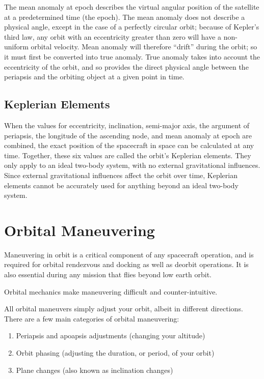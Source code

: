 The mean anomaly at epoch describes the virtual angular position of
the satellite at a predetermined time (the epoch). The mean anomaly
does not describe a physical angle, except in the case of a perfectly
circular orbit; because of Kepler's third law, any orbit with an
eccentricity greater than zero will have a non-uniform orbital
velocity. Mean anomaly will therefore ``drift'' during the orbit; so
it must first be converted into true anomaly. True anomaly takes into
account the eccentricity of the orbit, and so provides the direct
physical angle between the periapsis and the orbiting object at a
given point in time.

\subsection{Keplerian Elements}

When the values for eccentricity, inclination, semi-major axis, the
argument of periapsis, the longitude of the ascending node, and mean
anomaly at epoch are combined, the exact position of the spacecraft in
space can be calculated at any time. Together, these six values are
called the orbit's Keplerian elements. They only apply to an ideal
two-body system, with no external gravitational influences. Since
external gravitational influences affect the orbit over time,
Keplerian elements cannot be accurately used for anything beyond an
ideal two-body system.

\section{Orbital Maneuvering}

Maneuvering in orbit is a critical component of any spacecraft
operation, and is required for orbital rendezvous and docking as well
as deorbit operations. It is also essential during any mission that
flies beyond low earth orbit.

Orbital mechanics make maneuvering difficult and counter-intuitive.

All orbital maneuvers simply adjust your orbit, albeit in different
directions. There are a few main categories of orbital maneuvering:

\vspace{2em}

\begin{enumerate}
\item Periapsis and apoapsis adjustments (changing your altitude)
\item Orbit phasing (adjusting the duration, or period, of your orbit)
\item Plane changes (also known as inclination changes)
\end{enumerate}

